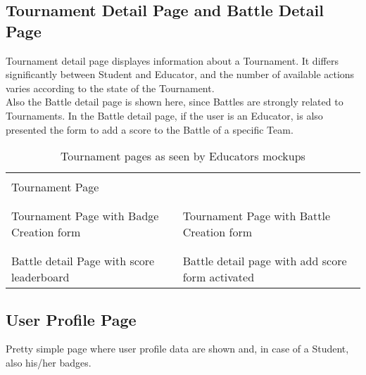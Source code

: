 \subsection{Tournament Detail Page and Battle Detail Page}
Tournament detail page displayes information about a Tournament. It differs significantly between Student and Educator, and the number of available actions varies according to the state of the Tournament.\\
Also the Battle detail page is shown here, since Battles are strongly related to Tournaments. In the Battle detail page, if the user is an Educator, is also presented the form to add a score to the Battle of a specific Team.\\
\clearpage
{}
\begin{table}
    \begin{tabu}{X[c, .5] X[c, .5]} 
         &  \\
        Tournament Page & \\
        & \\
         &  \\
        Tournament Page with Badge Creation form & Tournament Page with Battle Creation form\\
        & \\
         &  \\
        Battle detail Page with score leaderboard & Battle detail page with add score form activated\\
    \end{tabu}
    \caption{Tournament pages as seen by Educators mockups}
\end{table}
\clearpage
\subsection{User Profile Page}
Pretty simple page where user profile data are shown and, in case of a Student, also his/her badges.\\
\clearpage
